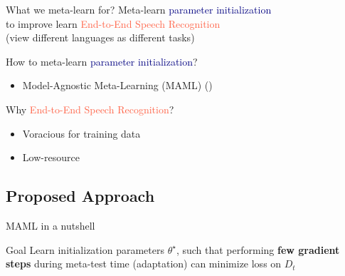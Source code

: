 \documentclass{beamer}
\begin{document}
\begin{frame}[t]{What we meta-learn for?}
  \centering Meta-learn \textcolor{navy}{parameter initialization} \\ to improve learn \textcolor{tomato}{End-to-End Speech Recognition} \\
  (view different languages as different tasks)

  \pause
  \flushleft How to meta-learn \textcolor{navy}{parameter initialization}?
  \begin{itemize}
    \item Model-Agnostic Meta-Learning (MAML) (\citealt{finn2017model})
  \end{itemize}

  \pause

  Why \textcolor{tomato}{End-to-End Speech Recognition}?
  \begin{itemize}
    \item Voracious for training data
    \item Low-resource 
  \end{itemize}
\end{frame}

\subsection{Proposed Approach}

\begin{frame}[t]{MAML in a nutshell}
  \begin{block}{Goal}
    Learn initialization parameters $\theta^\star$, such that performing \textbf{few gradient steps} during meta-test time (adaptation) can minimize loss on $D_t$
  \end{block}
  \flushright \hyperlink{overview of maml}{}
\end{frame}
\end{document}
